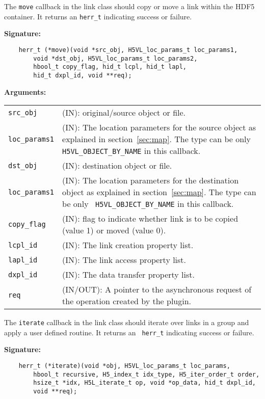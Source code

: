 The {\tt move} callback in the link class should copy or move a link
within the HDF5 container. It returns an {\tt herr\_t} indicating
success or failure.

\textbf{Signature:}
\begin{lstlisting}
    herr_t (*move)(void *src_obj, H5VL_loc_params_t loc_params1,
        void *dst_obj, H5VL_loc_params_t loc_params2,
        hbool_t copy_flag, hid_t lcpl, hid_t lapl, 
        hid_t dxpl_id, void **req);
\end{lstlisting}

\textbf{Arguments:}\\
\begin{tabular}{l p{10cm}}
  {\tt src\_obj} & (IN): original/source object or file. \\
  {\tt loc\_params1} & (IN): The location parameters for the source
  object as explained in section~\ref{sec:map}. The type can be only {\tt
    H5VL\_OBJECT\_BY\_NAME} in this callback. \\
  {\tt dst\_obj} & (IN): destination object or file. \\
  {\tt loc\_params1} & (IN): The location parameters for the destination
  object as explained in section~\ref{sec:map}. The type can be only {\tt
    H5VL\_OBJECT\_BY\_NAME} in this callback. \\
  {\tt copy\_flag} & (IN): flag to indicate whether link is to be
  copied (value 1) or moved (value 0).\\
  {\tt lcpl\_id} & (IN): The link creation property list.\\
  {\tt lapl\_id} & (IN): The link access property list.\\
  {\tt dxpl\_id} & (IN): The data transfer property list.\\
  {\tt req} & (IN/OUT): A pointer to the asynchronous request of the
  operation created by the plugin.\\
\end{tabular}

The {\tt iterate} callback in the link class should iterate over links
in a group and apply a user defined routine. It returns an {\tt
  herr\_t} indicating success or failure.

\textbf{Signature:}
\begin{lstlisting}
    herr_t (*iterate)(void *obj, H5VL_loc_params_t loc_params, 
        hbool_t recursive, H5_index_t idx_type, H5_iter_order_t order, 
        hsize_t *idx, H5L_iterate_t op, void *op_data, hid_t dxpl_id, 
        void **req);
\end{lstlisting}

